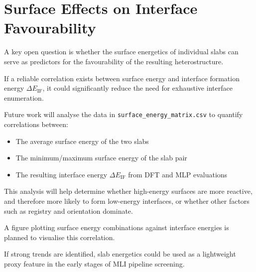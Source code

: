 \section{Surface Effects on Interface Favourability}\label{section:surface_effects}


A key open question is whether the surface energetics of individual slabs can serve as predictors for the favourability
of the resulting heterostructure.

If a reliable correlation exists between surface energy and interface formation energy \( \Delta E_\mathrm{IF} \), it
could significantly reduce the need for exhaustive interface enumeration.


Future work will analyse the data in \texttt{surface\_energy\_matrix.csv} to quantify correlations between:


\begin{itemize}
    \item The average surface energy of the two slabs
    \item The minimum/maximum surface energy of the slab pair
    \item The resulting interface energy \( \Delta E_\mathrm{IF} \) from DFT and MLP evaluations
\end{itemize}


This analysis will help determine whether high-energy surfaces are more reactive, and therefore more likely to form
low-energy interfaces, or whether other factors such as registry and orientation dominate.


A figure plotting surface energy combinations against interface energies is planned to visualise this correlation.

If strong trends are identified, slab energetics could be used as a lightweight proxy feature in the early stages of MLI
pipeline screening.



